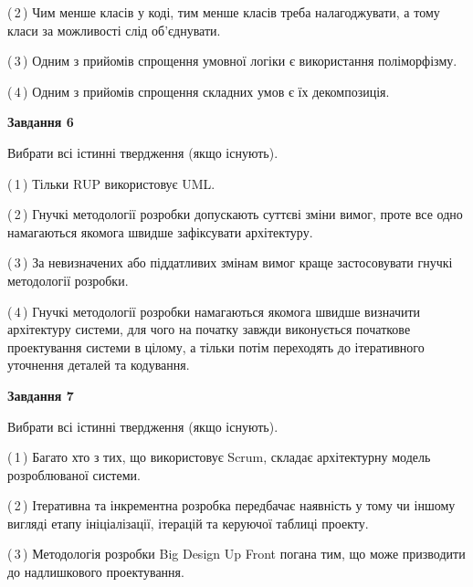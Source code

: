 \documentclass[10pt, ukrainian]{article}
\begin{document}
{\begin {large}
(\,2\,) Чим менше класів у коді, тим менше класів треба налагоджувати, а тому класи за можливості слід об'єднувати. %



(\,3\,) Одним з прийомів спрощення умовної логіки є використання поліморфізму. %



(\,4\,) Одним з прийомів спрощення складних умов є їх декомпозиція. %

\newpage

{\begin {center}\textbf{Завдання 6}\end {center}}\par
Вибрати всі істинні твердження (якщо існують).\par
\vspace{2mm}



(\,1\,) Тільки RUP використовує UML.%



(\,2\,) Гнучкі методології розробки допускають суттєві зміни вимог, проте все одно намагаються якомога швидше зафіксувати архітектуру. %



(\,3\,) За невизначених або піддатливих змінам вимог краще застосовувати гнучкі методології розробки. %



(\,4\,) Гнучкі методології розробки намагаються якомога швидше визначити архітектуру системи, для чого на початку завжди виконується початкове проектування системи в цілому, а тільки потім переходять до ітеративного уточнення деталей та кодування. %


{\begin {center}\textbf{Завдання 7}\end {center}}\par
Вибрати всі істинні твердження (якщо існують).\par
\vspace{2mm}



(\,1\,) Багато хто з тих, що використовує Scrum, складає архітектурну модель розроблюваної системи. %



(\,2\,) Ітеративна та інкрементна розробка передбачає наявність у тому чи іншому вигляді етапу ініціалізації, ітерацій та керуючої таблиці проекту. %



(\,3\,) Методологія розробки Big Design Up Front погана тим, що може призводити до надлишкового проектування. %




\end{large}}
\end{document}
